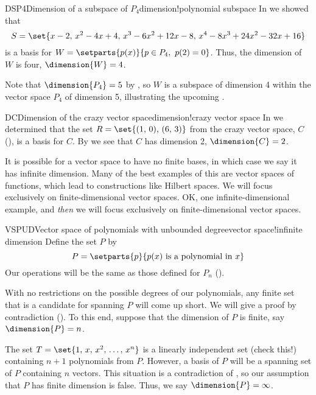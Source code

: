 %
\begin{example}{DSP4}{Dimension of a subspace of $P_4$}{dimension!polynomial subspace}
In  we showed that
%
\begin{equation*}
S=\set{x-2,\,x^2-4x+4,\,x^3-6x^2+12x-8,\,x^4-8x^3+24x^2-32x+16}
\end{equation*}
%
is a basis for $W=\setparts{p(x)}{p\in P_4,\ p(2)=0}$.  Thus, the dimension of $W$ is four, $\dimension{W}=4$.\par
%
Note that $\dimension{P_4}=5$ by , so $W$ is a subspace of dimension 4 within the vector space $P_4$ of dimension 5, illustrating the upcoming .
%
\end{example}
%
%
\begin{example}{DC}{Dimension of the crazy vector space}{dimension!crazy vector space}
In   we determined that the set $R=\set{(1,\,0),\,(6,\,3)}$ from the crazy vector space, $C$ (), is a basis for $C$.  By  we see that $C$ has dimension 2, $\dimension{C}=2$.
\end{example}
%
It is possible for a vector space to have no finite bases, in which case we say it has infinite dimension.  Many of the best examples of this are vector spaces of functions, which lead to constructions like Hilbert spaces.  We will focus exclusively on finite-dimensional vector spaces.  OK, one infinite-dimensional example, and {\em then} we will focus exclusively on finite-dimensional vector spaces.
%
\begin{example}{VSPUD}{Vector space of polynomials with unbounded degree}{vector space!infinite dimension}
Define the set $P$ by
%
\begin{equation*}
P=\setparts{p}{p(x)\text{ is a polynomial in }x}
\end{equation*}
%
Our operations will be the same as those defined for $P_n$ ().\par
%
With no restrictions on the possible degrees of our polynomials, any finite set that is a candidate for spanning $P$ will come up short.  We will give a proof by contradiction ().  To this end, suppose that the dimension of $P$ is finite, say $\dimension{P}=n$.\par
%
The set $T=\set{1,\,x,\,x^2,\,\ldots,\,x^n}$ is a linearly independent set (check this!) containing $n+1$ polynomials from $P$.  However, a basis of $P$ will be a spanning set of $P$ containing $n$ vectors.  This situation is a contradiction of , so our assumption that $P$ has finite dimension is false.  Thus, we say $\dimension{P}=\infty$.
\end{example}
